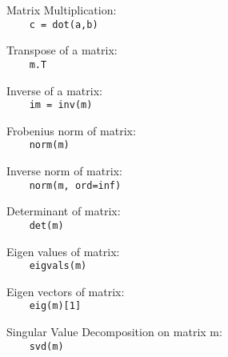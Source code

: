 Matrix Multiplication:\\
{\ex \lstinline|    c = dot(a,b)|}

Transpose of a matrix:\\
{\ex \lstinline|    m.T|}

Inverse of a matrix:\\
{\ex \lstinline|    im = inv(m)|}

Frobenius norm of matrix:\\
{\ex \lstinline|    norm(m)|}

Inverse norm of matrix:\\
{\ex \lstinline|    norm(m, ord=inf)|}

Determinant of matrix:\\
{\ex \lstinline|    det(m)|}

Eigen values of matrix:\\
{\ex \lstinline|    eigvals(m)|}

Eigen vectors of matrix:\\
{\ex \lstinline|    eig(m)[1]|}

Singular Value Decomposition on matrix m:\\
{\ex \lstinline|    svd(m)|}
